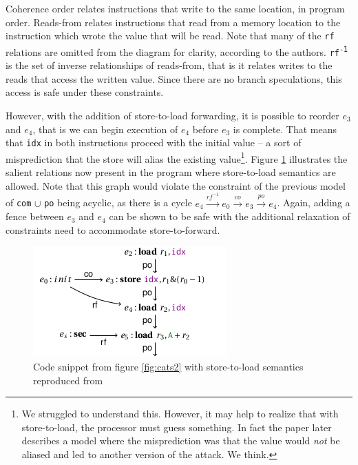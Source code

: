 \documentclass[11pt,conference]{IEEEtran}
\begin{document}
Coherence order relates instructions that write to the same location, in program order.
Reads-from relates instructions that read from a memory location to the instruction which wrote the value that will be read.
Note that many of the \texttt{rf} relations are omitted from the diagram for clarity, according to the authors.
\texttt{rf\textsuperscript{-1}} is the set of inverse relationships of reads-from, that is it relates writes to the reads that access the written value.
Since there are no branch speculations, this access is safe under these constraints.

However, with the addition of store-to-load forwarding, it is possible to reorder $e_3$ and $e_4$, that is we can begin execution of $e_4$ before $e_3$ is complete.
That means that \texttt{idx} in both instructions proceed with the initial value -- a sort of misprediction that the store will alias the existing value\footnote{
	We struggled to understand this.
	However, it may help to realize that with store-to-load, the processor must guess something.
	In fact the paper later describes a model where the misprediction was that the value would \emph{not} be aliased and led to another version of the attack.
	We think.
}.
Figure \ref{fig:cats3} illustrates the salient relations now present in the program where store-to-load semantics are allowed.
Note that this graph would violate the constraint of the previous model of \texttt{com} $\cup$ \texttt{po} being acyclic, as there is a cycle $e_4\xrightarrow{rf^{-1}}e_0\xrightarrow{co}e_3\xrightarrow{po}e_4$.
Again, adding a fence between $e_3$ and $e_4$ can be shown to be safe with the additional relaxation of constraints need to accommodate store-to-forward.

\begin{figure}[t]
  \centering
  \includegraphics[width=0.6\linewidth]{cats3}
	\caption{Code snippet from figure \ref{fig:cats2} with store-to-load semantics reproduced from \cite{cats2022}}
  \label{fig:cats3}
\end{figure}
\end{document}

